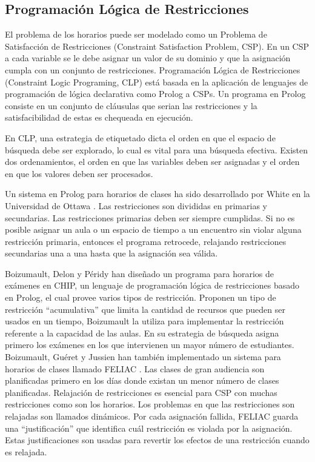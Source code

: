 \subsection{Programación Lógica de Restricciones}

El problema de los horarios puede ser modelado como un Problema de Satisfacción de Restricciones (Constraint Satisfaction Problem, CSP). En un CSP a cada variable se le debe asignar un valor de su dominio y que la asignación cumpla con un conjunto de restricciones. Programación Lógica de Restricciones (Constraint Logic Programing, CLP) est\'a basada en la aplicación de lenguajes de programación de lógica declarativa como Prolog a CSPs. Un programa en Prolog consiste en un conjunto de cl\'ausulas que serian las restricciones y la satisfacibilidad de estas es chequeada en ejecución.

En CLP, una estrategia de etiquetado dicta el orden en que el espacio de búsqueda debe ser explorado, lo cual es vital para una búsqueda efectiva. Existen dos ordenamientos, el orden en que las variables deben ser asignadas y el orden en que los valores deben ser procesados.

Un sistema en Prolog para horarios de clases ha sido desarrollado por White en la Universidad de Ottawa \cite{L Kang and GM White, C Cheng and L Kang and N Leung and GM White}. Las restricciones son divididas en primarias y secundarias. Las restricciones primarias deben ser siempre cumplidas. Si no es posible asignar un aula o un espacio de tiempo a un encuentro sin violar alguna restricción primaria, entonces el programa retrocede, relajando restricciones secundarias una a una hasta que la asignación sea válida.

Boizumault, Delon y P\'eridy han diseñado un programa para horarios de exámenes \cite{P Boizumault and Y Delon and L Peridy} en CHIP, un lenguaje de programación lógica de restricciones basado en Prolog, el cual provee varios tipos de restricción. Proponen un tipo de restricción ``acumulativa'' que limita la cantidad de recursos que pueden ser usados en un tiempo, Boizumault la utiliza para implementar la restricción referente a la capacidad de las aulas. En su estrategia de búsqueda asigna primero los exámenes en los que intervienen un mayor número de estudiantes. Boizumault, Gu\'eret y Jussien han tambi\'en implementado un sistema para horarios de clases llamado FELIAC \cite{P Boizumault and C Gueret and N Jussien, C Gueret and N Jussien and P Boizumault and C Prins}. Las clases de gran audiencia son planificadas primero en los d\'ias donde existan un menor número de clases planificadas. Relajación de restricciones es esencial para CSP con muchas restricciones como son los horarios. Los problemas en que las restricciones son relajadas son llamados dinámicos. Por cada asignación fallida, FELIAC guarda una ``justificación'' que identifica cuál restricción es violada por la asignación. Estas justificaciones son usadas para revertir los efectos de una restricción cuando es relajada.

